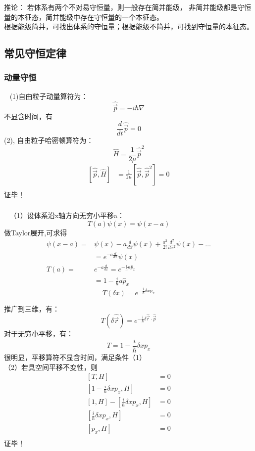 \begin{frame}
    \begin{tcolorbox2}{推论：}
        若体系有两个不对易守恒量，则一般存在简并能级， 非简并能级都是守恒量的本征态，简并能级中存在守恒量的一个本征态。\\
        根据能级简并，可找出体系的守恒量；根据能级不简并，可找到守恒量的本征态。
    \end{tcolorbox2}
\end{frame}

\subsection{常见守恒定律}

\begin{frame} 
    \frametitle{动量守恒} 
    \例[3.试证明自由粒子的动量是守恒量]{}                                   
    \证~ (1)自由粒子动量算符为：
    $$ \hat{\vec{p}} = -i\hbar\nabla  $$
    不显含时间，有 $$\frac{d}{dt}\hat{\vec{p}}=0$$ 
    (2), 自由粒子哈密顿算符为： $$ \hat{H} = \frac{1}{2\mu} \hat{\vec{p}}^2 $$
    $$\begin{aligned}
        [\hat{\vec{p}},\hat{H}]&= \frac{1}{2\mu}[\hat{\vec{p}}, \hat{\vec{p}}^2 ] =0 \\
    \end{aligned}$$
    证毕！
\end{frame}

\begin{frame} 
    \frametitle{} 
    \例[4.试证明空间平移不变性导致动量守恒]{}                                
    \证~ （1）设体系沿x轴方向无穷小平移a：
    $$ T(a)\psi(x)=\psi(x-a) $$
    做Taylor展开,可求得
    \[\begin{aligned}
        \psi(x-a)=&\psi(x) -a \frac{d}{d x} \psi(x)+\frac{a^{2}}{2 !} \frac{d^{2}}{d x^{2}} \psi(x)-\ldots \\
        &=e^{-a \frac{d}{d x}} \psi(x) \\
    T(a)=&e^{-a \frac{d}{d x}}= e^{-\frac{i}{\hbar}a \hat{p}_x}\\
        &=1-\frac{i}{\hbar}a \hat{p}_x 
    \end{aligned}\]   
 $$T(\delta x)= e^{-\frac{i}{\hbar}\delta x p_x } $$ 
\end{frame}

\begin{frame}    
    推广到三维，有：
    $$ T(\delta \hat{\vec{r}})= e^{-\frac{i}{\hbar}\delta \hat{\vec{r}}\cdot \hat{\vec{p}} }  $$ 
    对于无穷小平移，有：
    $$T=1-\frac{i}{\hbar}\delta x p_x$$
    很明显，平移算符不显含时间，满足条件（1）\\
    （2）若具空间平移不变性，则
    $$\begin{aligned}
        [T,H]&= 0 \\
        [1-\frac{i}{\hbar}\delta x p_x, H] &=0 \\
        [1, H]-[\frac{i}{\hbar}\delta x p_x, H]&=0 \\
        [\frac{i}{\hbar}\delta x p_x, H]&=0 \\
        [p_x, H] &=0 \\
    \end{aligned}$$
    证毕！
\end{frame}

